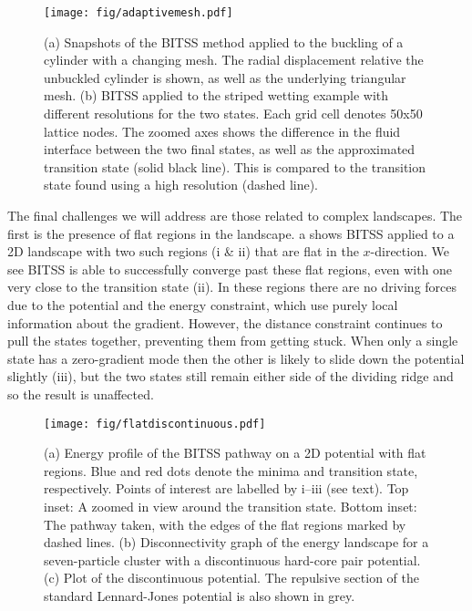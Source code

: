 \documentclass[aps,prl,twocolumn,10pt,groupedaddress]{revtex4-2}
\begin{document}
\begin{figure}[tb]
  \texttt{[image: fig/adaptivemesh.pdf]}
  \caption{\label{fig:adaptivemesh}
    (a) Snapshots of the BITSS method applied to the buckling of a cylinder with a changing mesh.
        The radial displacement relative the unbuckled cylinder is shown, as well as the underlying triangular mesh.
    (b) BITSS applied to the striped wetting example with different resolutions for the two states.
        Each grid cell denotes 50x50 lattice nodes.
        The zoomed axes shows the difference in the fluid interface between the two final states, as well as the approximated transition state (solid black line).
        This is compared to the transition state found using a high resolution (dashed line).
  }
\end{figure}


The final challenges we will address are those related to complex landscapes.
The first is the presence of flat regions in the landscape.
a shows BITSS applied to a 2D landscape with two such regions (i \& ii) that are flat in the $x$-direction.
We see BITSS is able to successfully converge past these flat regions, even with one very close to the transition state (ii).
In these regions there are no driving forces due to the potential and the energy constraint, which use purely local information about the gradient.
However, the distance constraint continues to pull the states together, preventing them from getting stuck.
When only a single state has a zero-gradient mode then the other is likely to slide down the potential slightly (iii), but the two states still remain either side of the dividing ridge and so the result is unaffected.

\begin{figure}[tb]
  \texttt{[image: fig/flatdiscontinuous.pdf]}
  \caption{\label{fig:flatdiscontinuous}
    (a) Energy profile of the BITSS pathway on a 2D potential with flat regions.
        Blue and red dots denote the minima and transition state, respectively.
        Points of interest are labelled by i--iii (see text).
        Top inset: A zoomed in view around the transition state.
        Bottom inset: The pathway taken, with the edges of the flat regions marked by dashed lines.
    (b) Disconnectivity graph of the energy landscape for a seven-particle cluster with a discontinuous hard-core pair potential.
    (c) Plot of the discontinuous potential.
        The repulsive section of the standard Lennard-Jones potential is also shown in grey.
  }
\end{figure}
\end{document}

